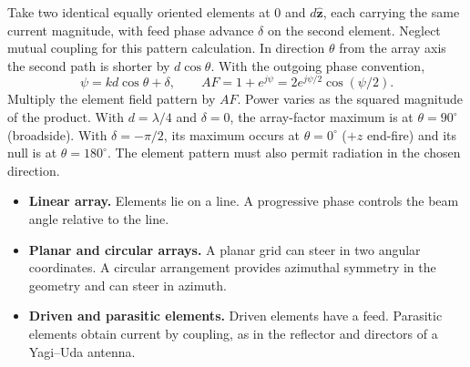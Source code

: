 \documentclass[12pt,a4paper]{article}
\begin{document}
Take two identical equally oriented elements at $0$ and $d\hat{\mathbf z}$, each carrying the same current magnitude, with feed phase advance $\delta$ on the second element. Neglect mutual coupling for this pattern calculation. In direction $\theta$ from the array axis the second path is shorter by $d\cos\theta$. With the outgoing phase convention,
\[
\psi=kd\cos\theta+\delta,\qquad
AF=1+e^{j\psi}=2e^{j\psi/2}\cos(\psi/2).
\]
Multiply the element field pattern by $AF$. Power varies as the squared magnitude of the product. With $d=\lambda/4$ and $\delta=0$, the array-factor maximum is at $\theta=90^\circ$ (broadside). With $\delta=-\pi/2$, its maximum occurs at $\theta=0^\circ$ ($+z$ end-fire) and its null is at $\theta=180^\circ$. The element pattern must also permit radiation in the chosen direction.
\begin{itemize}[leftmargin=*,itemsep=3pt]
\item \textbf{Linear array.} Elements lie on a line. A progressive phase controls the beam angle relative to the line.
\item \textbf{Planar and circular arrays.} A planar grid can steer in two angular coordinates. A circular arrangement provides azimuthal symmetry in the geometry and can steer in azimuth.
\item \textbf{Driven and parasitic elements.} Driven elements have a feed. Parasitic elements obtain current by coupling, as in the reflector and directors of a Yagi--Uda antenna.
\end{itemize}
\end{document}
